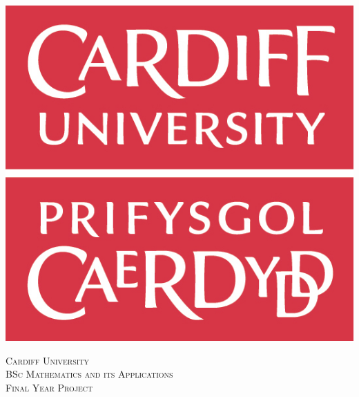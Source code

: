 \documentclass[11pt,a4paper]{report}
\begin{document}
\begin{titlepage}
	
	\newcommand{\HRule}{\rule{\linewidth}{0.5mm}} %
	
	\center %
	
	\includegraphics[scale=0.2]{images/logo.jpg}\\[1cm] %
	
	\vspace{0.4cm}
	
	\textsc{\LARGE Cardiff University}\\[1.5cm] %
	\textsc{\Large BSc Mathematics and its Applications}\\[0.5cm] %
	\textsc{\large Final Year Project}\\ %
	

\end{titlepage}
\end{document}
